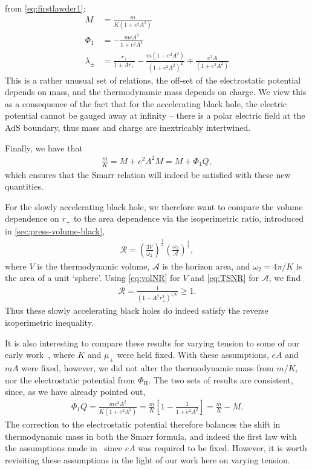 \documentclass[
twoside,
openright,
frontopenright,
]{dmathesis}
\newcommand{\nn}{\nonumber}
\begin{document}
from \cref{eq:firstlawder1}:
\begin{align}
M &= \frac{m}{K(1+e^2 A^2)} \nn\\
\Phi_1 &= -\frac{meA^2}{1+e^2 A^2}\nn\\
\lambda_\pm &= \frac{r_+}{1\pm Ar_+} - \frac{m(1-e^2A^2)}{(1+e^2 A^2)^2} 
\mp \frac{e^2A}{(1+e^2 A^2)}
\label{TDparams}
\end{align}
This is a rather unusual set of relations, the off-set of the electrostatic
potential depends on mass, and the thermodynamic mass depends on charge. We view
this as a consequence of the fact that for the accelerating black hole, the
electric potential cannot be gauged away at infinity -- there is a polar
electric field at the AdS boundary, thus mass and charge are inextricably
intertwined.

Finally, we have that
\begin{align}
  \frac{m}{K} = M+e^2A^2M = M+\Phi_1Q,
\end{align}
which ensures that the Smarr relation will indeed be satisfied with these new
quantities.

For the slowly accelerating black hole, we therefore want to compare the volume
dependence on $r_+$ to the area dependence via the isoperimetric ratio,
introduced in \cref{sec:press-volume-black},
\begin{align}
\mathcal{R}=\left(\frac{3V}{\omega_{2}}\right)^\frac13
  \left(\frac{\omega_{2}}{\mathcal{A}}\right)^\frac12, 
\end{align}
where $V$ is the thermodynamic volume, $\mathcal{A}$ is the horizon area, and
$\omega_2=4\pi/K$ is the area of a unit `sphere'.  Using \cref{eq:volNR} for
$V$ and \cref{eq:TSNR} for $\mathcal{A}$, we find
\begin{align}
\mathcal{R}=\frac{1}{(1-A^2r_+^2)^{1/6}}\geqslant 1.
\end{align}
Thus these slowly accelerating black holes do indeed satisfy the
reverse isoperimetric inequality.



It is also interesting to compare these results for varying tension to some of
our early work~\cite{Appels:2016uha}, where $K$ and $\mu_\pm$ were held fixed.
With these assumptions, $eA$ and $mA$ were fixed, however, we did not alter the
thermodynamic mass from $m/K$, nor the electrostatic potential from
$\Phi_\mathrm{H}$. The two sets of results are consistent, since, as we have
already pointed out,
\begin{align*}
\Phi_1 Q = \frac{m e^2 A^2}{K(1+e^2 A^2)} 
= \frac{m}{K} \left [ 1 - \frac{1}{1+e^2 A^2} \right] = \frac{m}{K} - M.
\end{align*}
The correction to the electrostatic potential therefore balances the shift in
thermodynamic mass in both the Smarr formula, and indeed the first law with the
assumptions made in~\cite{Appels:2016uha} since $eA$ was required to be
fixed. However, it is worth revisiting these assumptions in the light of our
work here on varying tension.
\end{document}
